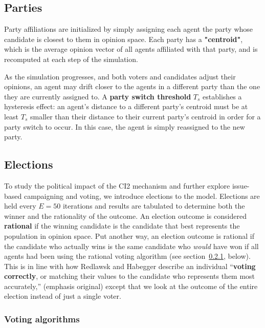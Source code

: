 \subsection{Parties}

Party affiliations are initialized by
simply assigning each agent the party whose candidate is closest to them in
opinion space. Each party has a \textbf{"centroid"}, which is the average
opinion vector of all agents affiliated with that party, and is recomputed at
each step of the simulation.

As the simulation progresses, and both voters and candidates
adjust their opinions, an agent may drift closer to the agents in a different
party than the one they are currently assigned to.
A \textbf{party switch
	threshold} $T_s$ establishes a hysteresis effect: an agent's distance to a
different party's centroid must be at least $T_s$ smaller than their distance
to their current party's centroid in order for a party switch to occur. In this
case, the agent is simply reassigned to the new party. 
 




\subsection{Elections}

To study the political impact of the CI2 mechanism and further explore
issue-based campaigning and voting, we introduce elections to the model.
Elections are held every $E=50$ iterations and results are tabulated to
determine both the winner and the rationality of the outcome. An election
outcome is considered \textbf{rational} if the winning candidate is the
candidate that best represents the population in opinion space. Put another
way, an election outcome is rational if the candidate who actually wins is the
same candidate who \textit{would} have won if all agents had been using the
rational voting algorithm (see section~\ref{votingAlgorithms}, below). This is
in line with how Redlawsk and Habegger describe an individual ``\textbf{voting
correctly}, or matching their values to the candidate who represents them most
accurately,''\cite[p.8]{redlawsk_citizens_2020} (emphasis original) except that
we look at the outcome of the entire election instead of just a single voter.

\subsubsection{Voting algorithms}
\label{votingAlgorithms}

